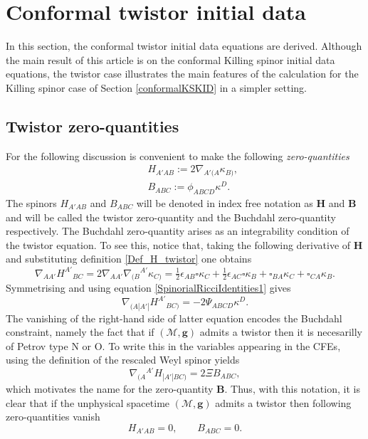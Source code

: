 \documentclass[10pt,a4paper]{article}
\theoremstyle{plain}
\def\bmg{{\bm g}}
\def\bmB{{\bm B}}
\def\bmH{{\bm H}}
\begin{document}
  \section{Conformal twistor initial data}
  \label{conformalTwistorKID}
  In this section, the conformal twistor initial data equations are
  derived.  Although the main result of this article is on the
  conformal  Killing spinor initial data equations, the twistor case
    illustrates the main features of the calculation for the Killing
  spinor case of Section \ref{conformalKSKID} in a simpler setting.
\subsection{Twistor zero-quantities}
\label{Sec:TwistorZeroQuantities}

For the following discussion is convenient to make the following
\emph{zero-quantities}
\begin{subequations}
  \begin{eqnarray}
   && H_{A'AB} := 2
    \nabla_{A'(A}\kappa_{B)},\label{Def_H_twistor}\\ && B_{ABC}
    := \phi_{ABCD}\kappa^D.\label{Def_B_twistor}
    \end{eqnarray}
\end{subequations}
The spinors $H_{A'AB}$ and $B_{ABC}$ will be denoted in index free
notation as $\bmH$ and $\bmB$ and will be called the twistor
zero-quantity and the Buchdahl zero-quantity respectively.  The
Buchdahl zero-quantity arises as an integrability condition of the
twistor equation.  To see this, notice that, taking the following
derivative of $\bmH$ and substituting definition
\eqref{Def_H_twistor} one obtains
  \begin{equation}\label{curl_H_twistor}
  \nabla_{AA'}H^{A'}{}_{BC}= 2 \nabla_{AA'}\nabla_{(B}{}^{A'}\kappa
  _{C)} = \tfrac{1}{2} \epsilon _{AB} \square \kappa _{C}  +
  \tfrac{1}{2}  \epsilon _{AC} \square \kappa _{B} +
  \square_{BA}\kappa _{C} + \square_{CA}\kappa _{B}.
  \end{equation}
  Symmetrising and using equation \eqref{SpinorialRicciIdentities1} gives
  \[
  \nabla_{(A|A'|}H^{A'}{}_{BC)}= - 2\Psi_{ABCD}\kappa^D.
  \]
  The vanishing of the right-hand side of latter equation encodes the
  Buchdahl constraint, namely the fact that if $(\mathcal{M},\bmg)$
  admits a twistor then it is necesarilly of Petrov type N or O. To
  write this in the variables appearing in the CFEs,
  using the definition of the rescaled Weyl spinor
  yields
  \begin{equation}\label{Curl_H_sym_toB_twistor}
  \nabla_{(A}{}^{A'}H_{|A'|BC)} = 2\Xi B_{ABC},
  \end{equation}
  which motivates the name for the zero-quantity $\bmB$.
  Thus, with this notation, it is clear that if the unphysical spacetime
  $(\mathcal{M},\bmg)$ admits a twistor  then following
  zero-quantities vanish
  \begin{equation}
H_{A'AB}=0, \qquad B_{ABC}=0.
  \end{equation}
  
\end{document}
